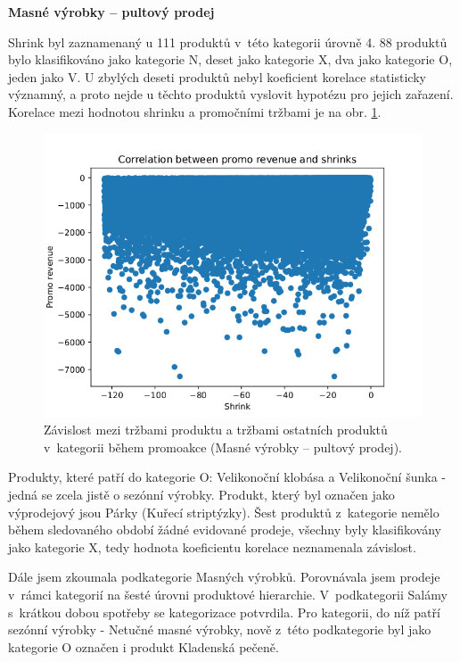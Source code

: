 \textbf{Masné výrobky -- pultový prodej}

Shrink byl zaznamenaný u 111 produktů v~této kategorii úrovně 4. 88 produktů bylo klasifikováno jako kategorie N, deset jako kategorie X, dva jako kategorie O, jeden jako V. U zbylých deseti produktů nebyl koeficient korelace statisticky významný, a proto nejde u těchto produktů vyslovit hypotézu pro jejich zařazení. Korelace mezi hodnotou shrinku a promočními tržbami je na obr. \ref*{obr:corr:maso}.

\begin{figure}[h!]
    \centering
    \captionsetup{justification=centering}
    \includegraphics[width=.8\textwidth]{obrazky/grafy/categorization_charts/categorization_charts_L4_PROCMEAT.png}
    \caption{Závislost mezi tržbami produktu a tržbami ostatních produktů \\ v~kategorii během promoakce (Masné výrobky -- pultový prodej).}
    \label{obr:corr:maso}
\end{figure}

Produkty, které patří do kategorie O: Velikonoční klobása a Velikonoční šunka - jedná se zcela jistě o sezónní výrobky. Produkt, který byl označen jako výprodejový jsou Párky (Kuřecí striptýzky). Šest produktů z~kategorie nemělo během sledovaného období žádné evidované prodeje, všechny byly klasifikovány jako kategorie X, tedy hodnota koeficientu korelace neznamenala závislost. %

Dále jsem zkoumala podkategorie Masných výrobků. Porovnávala jsem prodeje v~rámci kategorií na šesté úrovni produktové hierarchie. V~podkategorii Salámy s~krátkou dobou spotřeby se kategorizace potvrdila. Pro kategorii, do níž patří sezónní výrobky - Netučné masné výrobky, nově z~této podkategorie byl jako kategorie O označen i produkt Kladenská pečeně.

